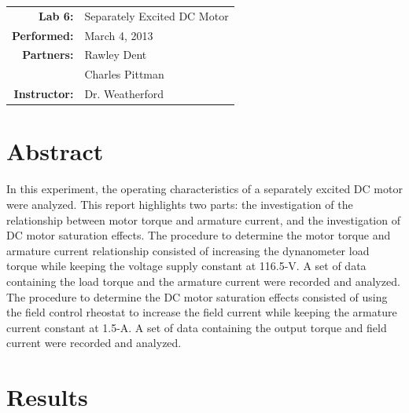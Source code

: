 \documentclass{article}
\begin{document}
\begin{tabular}{rl}
  \textbf{Lab 6:} & Separately Excited DC Motor \\
  \textbf{Performed:} & March 4, 2013 \\
  \textbf{Partners:} & Rawley Dent \\ & Charles Pittman \\
  \textbf{Instructor:} & Dr. Weatherford
\end{tabular}


\section*{Abstract}

In this experiment, the operating characteristics of a separately excited DC
motor were analyzed.  This report highlights two parts: the investigation of
the relationship between motor torque and armature current, and the
investigation of DC motor saturation effects. The procedure to determine the
motor torque and armature current relationship consisted of increasing the
dynanometer load torque while keeping the voltage supply constant at 116.5-V. A
set of data containing the load torque and the armature current were recorded
and analyzed. The procedure to determine the DC motor saturation effects
consisted of using the field control rheostat to increase the field current
while keeping the armature current constant at 1.5-A. A set of data containing
the output torque and field current were recorded and analyzed.

\section*{Results}
\end{document}
